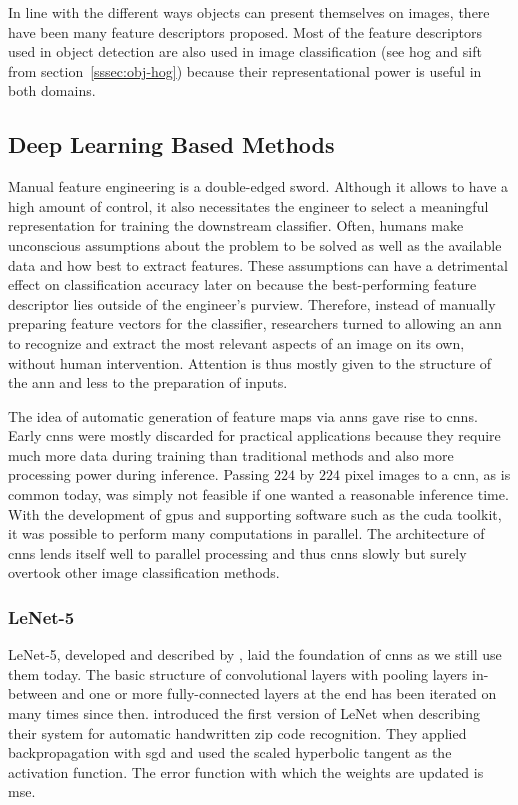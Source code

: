 \documentclass[draft,final]{vutinfth} %
\begin{document}
In line with the different ways objects can present themselves on
images, there have been many feature descriptors proposed. Most of the
feature descriptors used in object detection are also used in image
classification (see \gls{hog} and \gls{sift} from
section~\ref{sssec:obj-hog}) because their representational power is
useful in both domains.

\subsection{Deep Learning Based Methods}
\label{ssec:class-dl}

Manual feature engineering is a double-edged sword. Although it allows
to have a high amount of control, it also necessitates the engineer to
select a meaningful representation for training the downstream
classifier. Often, humans make unconscious assumptions about the
problem to be solved as well as the available data and how best to
extract features. These assumptions can have a detrimental effect on
classification accuracy later on because the best-performing feature
descriptor lies outside of the engineer's purview. Therefore, instead
of manually preparing feature vectors for the classifier, researchers
turned to allowing an \gls{ann} to recognize and extract the most
relevant aspects of an image on its own, without human
intervention. Attention is thus mostly given to the structure of the
\gls{ann} and less to the preparation of inputs.

The idea of automatic generation of feature maps via \glspl{ann} gave
rise to \glspl{cnn}. Early \glspl{cnn} \cite{lecun1989} were mostly
discarded for practical applications because they require much more
data during training than traditional methods and also more processing
power during inference. Passing $224$ by $224$ pixel images to a
\gls{cnn}, as is common today, was simply not feasible if one wanted a
reasonable inference time. With the development of \glspl{gpu} and
supporting software such as the \gls{cuda} toolkit, it was possible to
perform many computations in parallel. The architecture of \glspl{cnn}
lends itself well to parallel processing and thus \glspl{cnn} slowly
but surely overtook other image classification methods.

\subsubsection{LeNet-5}
\label{sssec:theory-lenet-5}

LeNet-5, developed and described by \textcite{lecun1998}, laid the
foundation of \glspl{cnn} as we still use them today. The basic
structure of convolutional layers with pooling layers in-between and
one or more fully-connected layers at the end has been iterated on
many times since then. \textcite{lecun1989} introduced the first
version of LeNet when describing their system for automatic
handwritten zip code recognition. They applied backpropagation with
\gls{sgd} and used the scaled hyperbolic tangent as the activation
function. The error function with which the weights are updated is
\gls{mse}.
\end{document}
